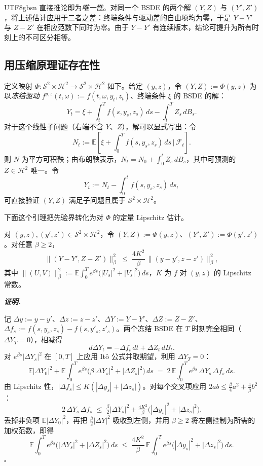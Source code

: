 \documentclass{article}
\newenvironment{proof}[1][证明]{%
  \par\smallskip\noindent\textit{\textbf{#1.}}\quad\ignorespaces
}{%
  \hfill$\square$\par\smallskip
}
\theoremstyle{plain}
\theoremstyle{definition}
\theoremstyle{remark}
\newcommand{\E}{\mathbb{E}}
\newcommand{\F}{\mathcal{F}}
\newcommand{\Sc}{\mathcal{S}}
\newcommand{\Hc}{\mathcal{H}}
\begin{document}
\begin{CJK*}{UTF8}{gbsn}
直接推论即为\emph{唯一性}。对同一个 BSDE 的两个解 $(Y,Z)$ 与 $(Y',Z')$，将上述估计应用于二者之差：终端条件与驱动差的自由项均为零，于是 $Y-Y'$ 与 $Z-Z'$ 在相应范数下同时为零。由于 $Y-Y'$ 有连续版本，结论可提升为所有时刻上的不可区分相等。

\subsection{用压缩原理证存在性}

定义映射 $\Phi : \Sc^2 \times \Hc^2 \to \Sc^2 \times \Hc^2$ 如下。给定 $(y, z)$，令 $(Y, Z) := \Phi(y, z)$ 为以\emph{冻结驱动} $f^{y,z}(t, \omega) := f(t, \omega, y_t, z_t)$、终端条件 $\xi$ 的 BSDE 的解：
\[
  Y_t = \xi + \int_t^T f(s, y_s, z_s)\,ds - \int_t^T Z_s\, dB_s.
\]
对于这个线性子问题（右端不含 $Y$、$Z$），解可以显式写出：令
\[
  N_t := \E\!\left[\xi + \int_0^T f(s, y_s, z_s)\,ds \,\bigg|\, \F_t\right].
\]
则 $N$ 为平方可积鞅；由布朗鞅表示，$N_t = N_0 + \int_0^t Z_s\, dB_s$，其中可预测的 $Z \in \Hc^2$ 唯一。令
\[
  Y_t := N_t - \int_0^t f(s, y_s, z_s)\,ds,
\]
可直接验证 $(Y, Z)$ 满足子问题且属于 $\Sc^2 \times \Hc^2$。

下面这个引理把先验界转化为对 $\Phi$ 的定量 Lipschitz 估计。

\begin{lemma}[差估计]\label{lem:diff}
对 $(y, z), (y', z') \in \Sc^2 \times \Hc^2$，令 $(Y, Z) := \Phi(y, z)$、$(Y', Z') := \Phi(y', z')$。对任意 $\beta \ge 2$，
\[
  \|(Y - Y', Z - Z')\|_\beta^2 \;\le\; \frac{4K^2}{\beta}\, \|(y - y', z - z')\|_\beta^2,
\]
其中 $\|(U, V)\|_\beta^2 := \E\!\int_0^T e^{\beta s}\big(|U_s|^2 + |V_s|^2\big)\,ds$，$K$ 为 $f$ 对 $(y, z)$ 的 Lipschitz 常数。
\end{lemma}

\begin{proof}
记 $\Delta y := y - y'$、$\Delta z := z - z'$、$\Delta Y := Y - Y'$、$\Delta Z := Z - Z'$、$\Delta f_s := f(s, y_s, z_s) - f(s, y'_s, z'_s)$。两个冻结 BSDE 在 $T$ 时刻完全相同（$\Delta Y_T = 0$），相减得
\[
  d\Delta Y_t = -\Delta f_t\, dt + \Delta Z_t\, dB_t.
\]
对 $e^{\beta s} |\Delta Y_s|^2$ 在 $[0, T]$ 上应用 It\^o 公式并取期望，利用 $\Delta Y_T = 0$：
\[
  \E|\Delta Y_0|^2 + \E\!\int_0^T e^{\beta s}\!\big(\beta |\Delta Y_s|^2 + |\Delta Z_s|^2\big)\, ds \;=\; 2\,\E\!\int_0^T e^{\beta s}\, \Delta Y_s\, \Delta f_s\, ds.
\]
由 Lipschitz 性，$|\Delta f_s| \le K(|\Delta y_s| + |\Delta z_s|)$。对每个交叉项应用 $2ab \le \tfrac{\beta}{4}a^2 + \tfrac{4}{\beta} b^2$：
\[
  2\, \Delta Y_s\, \Delta f_s \;\le\; \tfrac{\beta}{2}|\Delta Y_s|^2 + \tfrac{4 K^2}{\beta}\!\big(|\Delta y_s|^2 + |\Delta z_s|^2\big).
\]
丢掉非负项 $\E|\Delta Y_0|^2$，再把 $\tfrac{\beta}{2}|\Delta Y|^2$ 吸收到左侧，并用 $\beta \ge 2$ 将左侧控制为所需的加权范数，即得
\[
  \E\!\int_0^T e^{\beta s}\big(|\Delta Y_s|^2 + |\Delta Z_s|^2\big)\, ds \;\le\; \frac{4K^2}{\beta}\, \E\!\int_0^T e^{\beta s}\big(|\Delta y_s|^2 + |\Delta z_s|^2\big)\, ds.
\]
\end{proof}


\end{CJK*}
\end{document}
